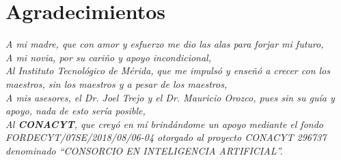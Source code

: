 \chapter*{Agradecimientos} %
\linespread{1.3}
\vspace*{\fill}
  \begin{flushright}
  \bgroup\em
  A mi madre, que con amor y esfuerzo me dio las alas para forjar mi futuro,\\
  A mi novia, por su cariño y apoyo incondicional,\\
  Al Instituto Tecnológico de Mérida, que me impulsó y enseñó a crecer con los maestros, sin los maestros y a pesar de los maestros,\\
  A mis asesores, el Dr. Joel Trejo y el Dr. Mauricio Orozco, pues sin su guía y apoyo, nada de esto sería posible,\\
  Al \textbf{CONACYT}, que creyó en mí brindándome un apoyo mediante el fondo FORDECYT/07SE/2018/08/06-04 otorgado al proyecto CONACYT 296737 denominado “CONSORCIO EN INTELIGENCIA ARTIFICIAL”.\\
  \egroup{}
  \end{flushright}
\vspace*{\fill}
\clearpage %